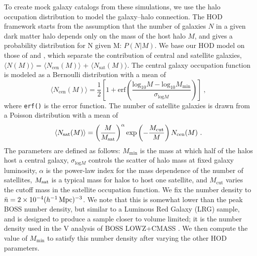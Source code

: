 To create mock galaxy catalogs from these simulations, we use the halo occupation distribution to model the galaxy--halo connection.
The HOD framework starts from the assumption that the number of galaxies $N$ in a given dark matter halo depends only on the mass of the host halo $M$, and gives a probability distribution for N given M: $P(N|M)$.  
We base our HOD model on those of \cite{Zheng2005} and \cite{reddick_connection_2013}, which separate the contribution of central and satellite galaxies, $\langle N(M) \rangle$ = $\langle N_\mathrm{cen}(M) \rangle$ + $\langle N_\mathrm{sat}(M) \rangle$.
The central galaxy occupation function is modeled as a Bernoulli distribution with a mean of
\begin{equation}
	\langle N_\mathrm{cen}(M) \rangle = \frac{1}{2} \left[ 1 + \mathrm{erf}
	\left(\frac{\mathrm{log}_{10} M - \mathrm{log}_{10} M_\mathrm{min} }{\sigma_{\mathrm{log}M}}\right) \right] ~,
\end{equation}
where \texttt{erf()} is the error function. 
The number of satellite galaxies is drawn from a Poisson distribution with a mean of 
\begin{equation}
	\langle N_\mathrm{sat}(M) \rangle = \left( \frac{M}{M_\mathrm{sat}} \right)^\alpha
	\mathrm{exp} \left( - \frac{M_\mathrm{cut}}{M} \right) N_\mathrm{cen}(M) ~.
\end{equation}
The parameters are defined as follows: $M_\mathrm{min}$ is the mass at which half of the halos host a central galaxy, $\sigma_{\mathrm{log}M}$ controls the scatter of halo mass at fixed galaxy luminosity, $\alpha$ is the power-law index for the mass dependence of the number of satellites, $M_\mathrm{sat}$ is a typical mass for halos to host one satellite, and $M_\mathrm{cut}$ varies the cutoff mass in the satellite occupation function.
We fix the number density to $\bar{n} = 2 \times 10^{-4} (h^{-1}\,\mathrm{Mpc})^{-3}$.
We note that this is somewhat lower than the peak BOSS number density, but similar to a Luminous Red Galaxy (LRG) sample, and is designed to produce a sample closer to volume limited; it is the number density used in the \aemulus V analysis of BOSS LOWZ+CMASS \citep{Zhai2022}.
We then compute the value of $M_\mathrm{min}$ to satisfy this number density after varying the other HOD parameters.

